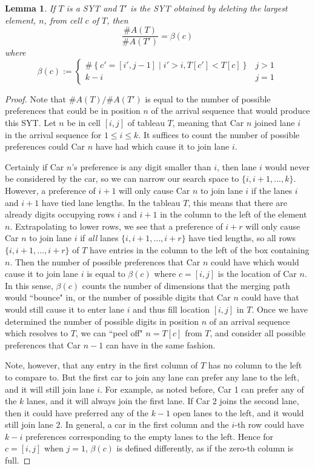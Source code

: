 \documentclass[article]{amsart}
\theoremstyle{plain}
\newtheorem{lemma}[proposition]{Lemma}
\theoremstyle{definition}
\begin{document}
\begin{lemma} \label{lem:bounce}
    If $T$ is a SYT and $T'$ is the SYT obtained by deleting the largest element, $n$, from cell $c$ of $T$, then
\[ \frac{\#A(T)}{\#A(T')} = \beta(c)\]
where
    $$\beta(c) := \begin{cases}
    \# \left\{ c' = [i', j-1] \mid i' > i, T[c'] < T[c]  \right\} & j > 1 \\
    k - i & j = 1
    \end{cases}$$
\end{lemma}

\begin{proof}
    Note that $\#A(T)/\#A(T')$ is equal to the number of possible preferences that could be in position $n$ of the arrival sequence that would produce this SYT. Let $n$ be in cell $[i,j]$ of tableau $T$, meaning that Car $n$ joined lane $i$ in the arrival sequence for $1 \leq i \leq k$. It suffices to count the number of possible preferences could Car $n$ have had which cause it to join lane $i$.
    
    Certainly if Car $n$'s preference is any digit smaller than $i$, then lane $i$ would never be considered by the car, so we can narrow our search space to $\{i, i+1, \dots, k\}$. However, a preference of $i+1$ will only cause Car $n$ to join lane $i$ if the lanes $i$ and $i+1$ have tied lane lengths. In the tableau $T$, this means that there are already digits occupying rows $i$ and $i+1$ in the column to the left of the element $n$. Extrapolating to lower rows, we see that a preference of $i + r$ will only cause Car $n$ to join lane $i$ if \textit{all} lanes $\{i, i+1, \dots, i+r\}$ have tied lengths, so all rows $\{i, i+1, \dots, i+r\}$ of $T$ have entries in the column to the left of the box containing $n$. Then the number of possible preferences that Car $n$ could have which would cause it to join lane $i$ is equal to $\beta(c)$ where $c = [i,j]$ is the location of Car $n$. In this sense, $\beta(c)$ counts the number of dimensions that the merging path would ``bounce" in, or the number of possible digits that Car $n$ could have that would still cause it to enter lane $i$ and thus fill location $[i,j]$ in $T$. Once we have determined the number of possible digits in position $n$ of an arrival sequence which resolves to $T$, we can ``peel off" $n = T[c]$ from $T$, and consider all possible preferences that Car $n-1$ can have in the same fashion. 
    
    Note, however, that any entry in the first column of $T$ has no column to the left to compare to. But the first car to join any lane can prefer any lane to the left, and it will still join lane $i$. For example, as noted before, Car 1 can prefer any of the $k$ lanes, and it will always join the first lane. If Car 2 joins the second lane, then it could have preferred any of the $k-1$ open lanes to the left, and it would still join lane 2. In general, a car in the first column and the $i$-th row could have $k-i$ preferences corresponding to the empty lanes to the left. Hence for $c = [i,j]$ when $j=1$, $\beta(c)$ is defined differently, as if the zero-th column is full.
\end{proof}
\end{document}
